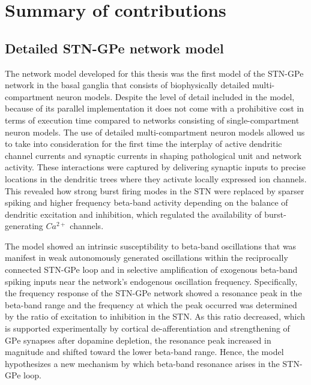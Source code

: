 %
%
%

%
%
%
%
%
%
%
%
%
%

\section{Summary of contributions}
%

\subsection{Detailed STN-GPe network model}

The network model developed for this thesis was the first model of the STN-GPe
network in the basal ganglia that consists of biophysically detailed
multi-compartment neuron models. Despite the level of detail included
in the model, because of its parallel implementation it does not come with
a prohibitive cost in terms of execution time compared to networks consisting of
single-compartment neuron models.
%
%
%
%
%
%
%
%
The use of detailed multi-compartment neuron models allowed us to take into
consideration for the first time the interplay of active dendritic channel currents
and synaptic currents in shaping pathological unit and network activity.
These interactions were captured by delivering synaptic inputs to precise locations
in the dendritic trees where they activate locally expressed ion channels.
This revealed how strong burst firing modes in the STN were replaced by sparser
spiking and higher frequency beta-band activity depending on the balance of dendritic
excitation and inhibition, which regulated the availability of burst-generating
$Ca^{2+}$ channels.
%

%
%
%
%
%
The model showed an intrinsic susceptibility to beta-band oscillations
that was manifest in weak autonomously generated oscillations within the reciprocally
connected STN-GPe loop and in selective amplification of exogenous beta-band spiking
inputs near the network's endogenous oscillation frequency. Specifically, the frequency
response of the STN-GPe network showed a resonance peak in the beta-band range and the
frequency at which the peak occurred was determined by the ratio of excitation to
inhibition in the STN. As this ratio decreased, which is
supported experimentally by cortical de-afferentiation and strengthening of GPe synapses
after dopamine depletion, the resonance peak increased in magnitude and shifted toward the
lower beta-band range. Hence, the model hypothesizes a new mechanism by which
beta-band resonance arises in the STN-GPe loop.

